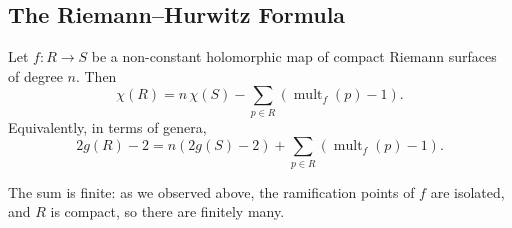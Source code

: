 \documentclass[a4paper]{scrartcl}
\newcommand{\mult}{\operatorname{mult}}
\begin{document}
\subsection{The Riemann--Hurwitz Formula}

\begin{theorem}\label{rs-thm:RH}
	Let $f : R \to S$ be a non-constant holomorphic map of compact Riemann surfaces of
	degree $n$. Then
	$$
	\chi(R) = n\,\chi(S) - \sum_{p \in R}\left(\mult_f(p) - 1\right).
	$$
	Equivalently, in terms of genera,
	$$
	2g(R) - 2 = n\left(2g(S) - 2\right) + \sum_{p\in R}\left(\mult_f(p)-1\right).
	$$
\end{theorem}

The sum is finite: as we observed above, the ramification points of $f$ are isolated, and
$R$ is compact, so there are finitely many.
\end{document}
